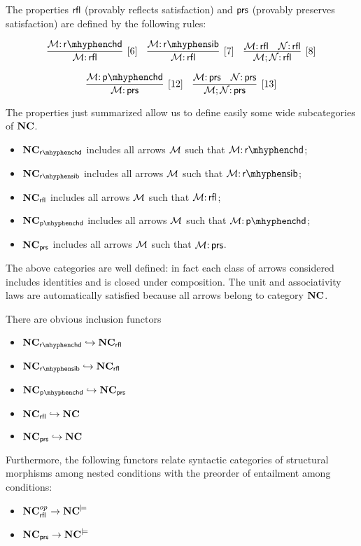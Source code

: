 \begin{definition}
    \label{def:prop-rfl-prs}
    The properties ${\mathsf{rfl}}$ (provably reflects satisfaction) and ${\mathsf{prs}}$ (provably preserves satisfaction) are defined by the following rules:

$$\infer[{[6]}]{\cM\of \rfl}{\cM\of \rchd} \quad \infer[{[7]}]{\cM\of \rfl}{\cM\of \rsib} \quad \infer[{[8]}]{\cM;\cN\of \rfl}{\cM\of \rfl & \cN \of \rfl} $$ 

$$\infer[{[12]}]{\cM\of \prs}{\cM\of \pchd} \quad
\infer[{[13]}]{\cM;\cN\of \prs}{\cM\of \prs & \cN \of \prs} $$ 
\end{definition}


The properties just summarized allow us to define easily some wide subcategories of $\NC$.

\begin{definition}[subcategories of $\NC$]
    \begin{itemize}
    \item $\NC_\rchd$ includes all arrows ${\mathcal{M}}$ such that $\cM\of \rchd$; 
    \item $\NC_\rsib$ includes all arrows ${\mathcal{M}}$ such that $\cM\of \rsib$;
    \item $\mathbf{NC}_{\mathsf{rfl}}$ includes all arrows ${\mathcal{M}}$ such that ${\mathcal{M}}{:}\, {\mathsf{rfl}}$;
    \item  $\NC_\pchd$ includes all arrows ${\mathcal{M}}$ such that $\cM\of \pchd$;
    \item $\mathbf{NC}_{\mathsf{prs}}$ includes all arrows ${\mathcal{M}}$ such that ${\mathcal{M}}{:}\, {\mathsf{prs}}$.
    \end{itemize}
    
    The above categories are well defined: in fact each class of arrows considered includes identities and is closed under composition. The unit and associativity laws are automatically satisfied because all arrows belong to category $\NC$.     
\end{definition}

\begin{proposition}
    There are obvious inclusion functors 
    \begin{itemize}
    \item $\NC_\rchd \hookrightarrow \NC_\rfl$
    \item $\NC_\rsib \hookrightarrow \NC_\rfl$
    \item $\NC_\pchd \hookrightarrow \NC_\prs$
    \item $\mathbf{NC}_{\mathsf{rfl}} \hookrightarrow \mathbf{NC}$
    \item $\mathbf{NC}_{\mathsf{prs}} \hookrightarrow \mathbf{NC}$
    \end{itemize}
    Furthermore, the following functors relate syntactic categories of structural morphisms among nested conditions with the preorder of entailment among conditions:
    \begin{itemize}
    \item $\mathbf{NC}_{\mathsf{rfl}}^{op} \rightarrow \mathbf{NC}^{\models}$
    \item $\mathbf{NC}_{\mathsf{prs}} \rightarrow \mathbf{NC}^{\models}$
    \end{itemize} 
\end{proposition}

